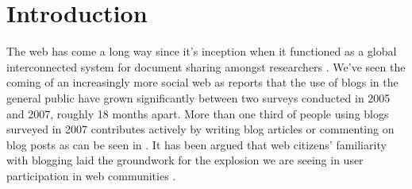 \chapter{Introduction}

%
%

The web has come a long way since it's inception when it functioned as a
global interconnected system for document sharing amongst researchers
\citep[p.~82]{bernerslee92}. We've
seen the coming of an increasingly more social web as
\citet[ch.~1, p.~2]{rosa07} reports that the
use of blogs in the general public%
have grown significantly between two surveys conducted in 2005 and 2007,
roughly 18 months apart.
More than one third of people using blogs surveyed in 2007 contributes
actively by writing blog articles or commenting on blog posts as can be seen
in 
\citep[ch.~1, p.~6]{rosa07}.
It has been argued that web citizens'
familiarity with blogging laid the groundwork for the explosion we are seeing
in user participation in web communities \citep{weiss05,beer07}.

\newcommand{\placeBlogSideTable}{%
  \sidetable{Blog Usage
             \label{table:blog.usage}}{%
    
    \begin{tabular}{lll}

      Year & Total & Active of total \\
      \midrule

      2005 & 16\% & Not known\\
      2007 & 45\% & 17\% \\

    \end{tabular}
  }
}

